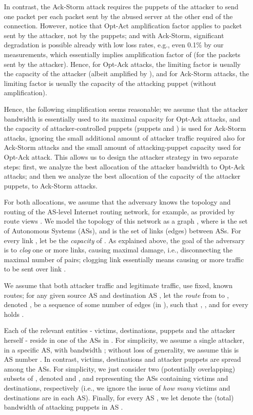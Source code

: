 \documentclass[conference]{IEEEtran}
\begin{document}
In contrast, the Ack-Storm attack requires the puppets of the attacker to send one packet per each packet sent by the abused server at the other end of the connection. However, notice that Opt-Act amplification factor applies to packet sent by the attacker, not by the puppets; and with Ack-Storm, significant degradation is possible already with low loss rates, e.g., even 0.1\% by our measurements, which essentially implies amplification factor of  (for the packets sent by the attacker). Hence, for Opt-Ack attacks, the limiting factor is usually the capacity of the attacker (albeit amplified by ), and for Ack-Storm attacks, the limiting factor is usually the capacity of the attacking puppet (without amplification). 

Hence, the following simplification seems reasonable; we assume that the attacker bandwidth is essentially used to its maximal capacity for Opt-Ack attacks, and the  capacity of attacker-controlled puppets (puppets and \wzs) is used for Ack-Storm attacks, ignoring the small additional amount of attacker traffic required also for Ack-Storm attacks and the small amount of attacking-puppet capacity used for Opt-Ack attack. This allows us to design the attacker strategy in two separate steps: first, we analyze the best allocation of the attacker bandwidth to Opt-Ack attacks; and then we analyze the best allocation of the capacity of the attacker puppets, to Ack-Storm attacks. 

For both allocations, we assume that the adversary knows the topology and routing of the AS-level Internet routing network, for example, as provided by route views \cite{routeviews}.
We model the topology of this network as a graph , where  is the set of Autonomous Systems (ASs), and  is the set of links (edges) between ASs. For every link , let  be the {\em capacity} of . As explained above, the goal of the adversary is to {\em clog} one or more links, causing maximal damage, i.e., disconnecting the maximal number of  pairs; clogging link  essentially means causing  or more traffic to be sent over link . 

We assume that both attacker traffic and legitimate traffic, use fixed, known routes; for any given source AS  and destination AS , let the {\em route} from  to , denoted , be a sequence of some number  of edges (in ), such that , , and for every  holds . 

Each of the relevant entities - victims, destinations, puppets and the attacker herself - reside in one of the ASs in . For simplicity, we assume a single attacker, in a specific AS, with bandwidth ; without loss of generality, we assume this is AS number . In contrast, victims, destinations and attacker puppets are spread among the ASs. For simplicity, we just consider two (potentially overlapping) subsets of , denoted  and , and  representing the ASs containing victims and destinations, respectively (i.e., we ignore the issue of {\em how many} victims and destinations are in each AS). Finally, for every AS , we let  denote the (total) bandwidth of attacking puppets in AS . 
\end{document}
